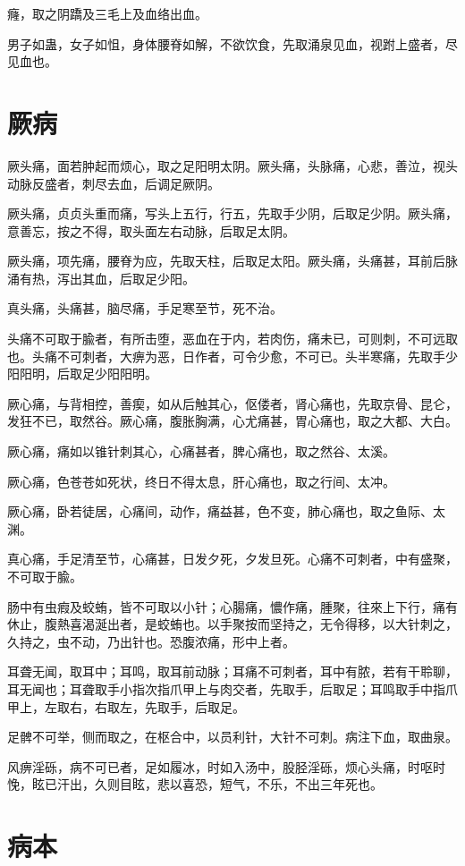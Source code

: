 \documentclass[a4paper,12pt,UTF8,twoside]{ctexbook}
\begin{document}
	癃，取之阴蹻及三毛上及血络出血。
	
	男子如蛊，女子如怚，身体腰脊如解，不欲饮食，先取涌泉见血，视跗上盛者，尽见血也。
	\chapter{厥病}
	
	厥头痛，面若肿起而烦心，取之足阳明太阴。厥头痛，头脉痛，心悲，善泣，视头动脉反盛者，刺尽去血，后调足厥阴。
	
	厥头痛，贞贞头重而痛，写头上五行，行五，先取手少阴，后取足少阴。厥头痛，意善忘，按之不得，取头面左右动脉，后取足太阴。
	
	厥头痛，项先痛，腰脊为应，先取天柱，后取足太阳。厥头痛，头痛甚，耳前后脉涌有热，泻出其血，后取足少阳。
	
	真头痛，头痛甚，脑尽痛，手足寒至节，死不治。
	
	头痛不可取于腧者，有所击堕，恶血在于内，若肉伤，痛未已，可则刺，不可远取也。头痛不可刺者，大痹为恶，日作者，可令少愈，不可已。头半寒痛，先取手少阳阳明，后取足少阳阳明。
	
	厥心痛，与背相控，善瘈，如从后触其心，伛偻者，肾心痛也，先取京骨、昆仑，发狂不已，取然谷。厥心痛，腹胀胸满，心尤痛甚，胃心痛也，取之大都、大白。
	
	厥心痛，痛如以锥针刺其心，心痛甚者，脾心痛也，取之然谷、太溪。
	
	厥心痛，色苍苍如死状，终日不得太息，肝心痛也，取之行间、太冲。
	
	厥心痛，卧若徒居，心痛间，动作，痛益甚，色不变，肺心痛也，取之鱼际、太渊。
	
	真心痛，手足清至节，心痛甚，日发夕死，夕发旦死。心痛不可刺者，中有盛聚，不可取于腧。
	
	肠中有虫瘕及蛟蛕，皆不可取以小针；心腸痛，憹作痛，腫聚，往來上下行，痛有休止，腹熱喜渴涎出者，是蛟蛕也。以手聚按而坚持之，无令得移，以大针刺之，久持之，虫不动，乃出针也。恐腹浓痛，形中上者。
	
	耳聋无闻，取耳中；耳鸣，取耳前动脉；耳痛不可刺者，耳中有脓，若有干聆聊，耳无闻也；耳聋取手小指次指爪甲上与肉交者，先取手，后取足；耳鸣取手中指爪甲上，左取右，右取左，先取手，后取足。
	
	足髀不可举，侧而取之，在枢合中，以员利针，大针不可刺。病注下血，取曲泉。
	
	风痹淫砾，病不可已者，足如履冰，时如入汤中，股胫淫砾，烦心头痛，时呕时悗，眩已汗出，久则目眩，悲以喜恐，短气，不乐，不出三年死也。
	\chapter{病本}
	
\end{document}
